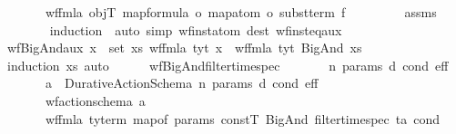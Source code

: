 \begin{isabellebody}
\ \ \ \ \ \ \ {\isachardoublequoteopen}wf{\isacharunderscore}{\kern0pt}fmla\ objT\ {\isacharparenleft}{\kern0pt}{\isacharparenleft}{\kern0pt}map{\isacharunderscore}{\kern0pt}formula\ o\ map{\isacharunderscore}{\kern0pt}atom\ o\ subst{\isacharunderscore}{\kern0pt}term{\isacharparenright}{\kern0pt}\ f\ {\isasymphi}{\isacharparenright}{\kern0pt}{\isachardoublequoteclose}\isanewline
%
\isadelimproof
\ \ \ \ \ \ %
\endisadelimproof
%
\isatagproof
{}\isamarkupfalse%
\ assms\isanewline
\ \ \ \ \ \ \isamarkupfalse%
\ {\isacharparenleft}{\kern0pt}induction\ {\isasymphi}{\isacharparenright}{\kern0pt}\ {\isacharparenleft}{\kern0pt}auto\ simp{\isacharcolon}{\kern0pt}\ wf{\isacharunderscore}{\kern0pt}inst{\isacharunderscore}{\kern0pt}atom\ dest{\isacharcolon}{\kern0pt}\ wf{\isacharunderscore}{\kern0pt}inst{\isacharunderscore}{\kern0pt}eq{\isacharunderscore}{\kern0pt}aux{\isacharparenright}{\kern0pt}%
\endisatagproof
{\isafoldproof}%
%
\isadelimproof
\isanewline
%
\endisadelimproof
\isanewline
\ \ \ \ \isamarkupfalse%
\ wf{\isacharunderscore}{\kern0pt}BigAnd{\isacharunderscore}{\kern0pt}aux{\isacharcolon}{\kern0pt}\ {\isachardoublequoteopen}{\isasymforall}x\ {\isasymin}\ set\ xs{\isachardot}{\kern0pt}\ wf{\isacharunderscore}{\kern0pt}fmla\ tyt\ x\ {\isasymLongrightarrow}\ wf{\isacharunderscore}{\kern0pt}fmla\ tyt\ {\isacharparenleft}{\kern0pt}BigAnd\ xs{\isacharparenright}{\kern0pt}{\isachardoublequoteclose}\isanewline
%
\isadelimproof
\ \ \ \ \ \ %
\endisadelimproof
%
\isatagproof
{}\isamarkupfalse%
\ {\isacharparenleft}{\kern0pt}induction\ xs{\isacharparenright}{\kern0pt}\ auto%
\endisatagproof
{\isafoldproof}%
%
\isadelimproof
\isanewline
%
\endisadelimproof
\isanewline
\ \ \ \ \isamarkupfalse%
\ wf{\isacharunderscore}{\kern0pt}BigAnd{\isacharunderscore}{\kern0pt}filter{\isacharunderscore}{\kern0pt}time{\isacharunderscore}{\kern0pt}spec{\isacharcolon}{\kern0pt}\isanewline
\ \ \ \ \ \ \ n\ params\ d\ cond\ eff\isanewline
\ \ \ \ \ \ \ {\isachardoublequoteopen}a\ {\isasymequiv}\ Durative{\isacharunderscore}{\kern0pt}Action{\isacharunderscore}{\kern0pt}Schema\ n\ params\ d\ cond\ eff{\isachardoublequoteclose}\ \ \isanewline
\ \ \ \ \ \ \ {\isachardoublequoteopen}wf{\isacharunderscore}{\kern0pt}action{\isacharunderscore}{\kern0pt}schema\ a{\isachardoublequoteclose}\isanewline
\ \ \ \ \ \ \ {\isachardoublequoteopen}wf{\isacharunderscore}{\kern0pt}fmla\ {\isacharparenleft}{\kern0pt}ty{\isacharunderscore}{\kern0pt}term\ {\isacharparenleft}{\kern0pt}map{\isacharunderscore}{\kern0pt}of\ params{\isacharparenright}{\kern0pt}\ constT{\isacharparenright}{\kern0pt}\ {\isacharparenleft}{\kern0pt}BigAnd\ {\isacharparenleft}{\kern0pt}filter{\isacharunderscore}{\kern0pt}time{\isacharunderscore}{\kern0pt}spec\ ta\ cond{\isacharparenright}{\kern0pt}{\isacharparenright}{\kern0pt}{\isachardoublequoteclose}\isanewline

\end{isabellebody}
